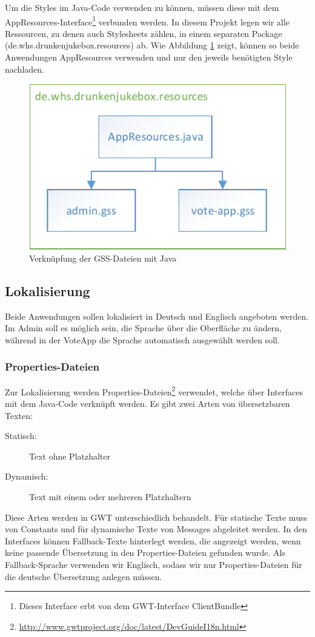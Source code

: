 Um die Styles im Java-Code verwenden zu können, müssen diese mit dem AppResources-Interface\footnote{Dieses Interface erbt von dem GWT-Interface ClientBundle} verbunden werden.
In diesem Projekt legen wir alle Ressourcen, zu denen auch Stylesheets zählen, in
einem separaten Package (de.whs.drunkenjukebox.resources) ab. Wie Abbildung
\ref{fig:GSS} zeigt, können so beide Anwendungen AppResources verwenden
und nur den jeweils benötigten Style nachladen.

\begin{figure}[tbh]
\centering
\includegraphics[width=0.6\linewidth]{Bilder/GSS}
\caption{Verknüpfung der GSS-Dateien mit Java}
\label{fig:GSS}
\end{figure}


\subsection{Lokalisierung}
Beide Anwendungen sollen lokalisiert in Deutsch und Englisch angeboten werden.
Im Admin soll es möglich sein, die Sprache über die Oberfläche zu ändern, während
in der VoteApp die Sprache automatisch ausgewählt werden soll.

\subsubsection{Properties-Dateien}

Zur Lokalisierung werden Properties-Dateien\footnote{\url{http://www.gwtproject.org/doc/latest/DevGuideI18n.html}} verwendet, welche über Interfaces
mit dem Java-Code verknüpft werden. Es gibt zwei Arten von übersetzbaren Texten:
\begin{description}
	\item[Statisch:] Text ohne Platzhalter
	\item[Dynamisch:] Text mit einem oder mehreren Platzhaltern
\end{description}
Diese Arten werden in GWT unterschiedlich behandelt. Für statische Texte muss
von Constants und für dynamische Texte von Messages abgeleitet werden. In den Interfaces können Fallback-Texte hinterlegt werden, die angezeigt werden, wenn keine passende Übersetzung in den Properties-Dateien gefunden wurde. Als
Fallback-Sprache verwenden wir Englisch, sodass wir nur Properties-Dateien für
die deutsche Übersetzung anlegen müssen.

